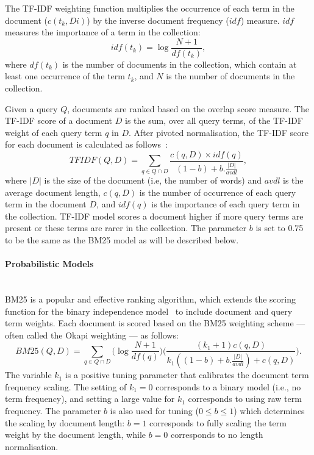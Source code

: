 The TF-IDF weighting function multiplies the occurrence of each term in the document ($ c(t_{k},Di)$)
by the inverse document frequency ($ idf $) measure. $ idf $ measures the importance of a term in the collection: 
\begin{equation}
idf(t_{k})=\log\frac{N+1}{df(t_{k})},
\label{eq:idf}
\end{equation}
where $ df(t_{k}) $ is the number of documents in the collection, which contain at least one occurrence of the term $ t_{k} $, and $ N $ is the number of documents in the collection. 

Given a query $Q$, documents are ranked based on the overlap score measure. The TF-IDF score of a document $D$ is the sum, over all query terms, of the TF-IDF weight of each query term $q$ in $D$. After pivoted normalisation, the TF-IDF score for each document is calculated as follows~\citep{bache2010improving}:
\begin{equation}
TFIDF(Q,D)=\sum\limits_{q \in Q\cap D}\frac{c(q,D)\times idf(q)}{(1-b)+b.\frac{|D|}{avdl}},
\label{eq:tfidf}
\end{equation}
where $ |D| $ is the size of the document (i.e, the number of words) and $ avdl $ is the average document length, $ c(q,D)$ is the number of occurrence of each query term in the document $D$, and $idf(q)$ is the importance of each query term in the collection. TF-IDF model scores a document higher if more query terms are present or these terms are rarer in the collection. The parameter $ b $ is set to 0.75 to be the same as the BM25 model as will be described below.
\paragraph{Probabilistic Models}
\ \\
BM25 is a popular and effective ranking algorithm, which extends the scoring function for the binary independence model~\citep{manning2008introduction} to include document and query term weights. Each document is scored based on the BM25 weighting scheme --- often called the Okapi weighting --- as follows:
\begin{equation}
BM25(Q,D)=\sum\limits_{q \in Q\cap D}\Bigg(\log\frac{N+1}{df(q)}\Bigg)\Bigg(\frac{(k_{1}+1)c(q,D)}{k_{1}((1-b)+b.\frac{|D|}{avdl})+c(q,D)}\Bigg).
\label{eq:idfbm25}
\end{equation}
The variable $ k_{1} $ is a positive tuning parameter that calibrates the document term frequency scaling. The setting of $ k_{1}=0 $ corresponds to a binary model (i.e., no term frequency), and setting a large value for $ k_{1} $ corresponds to using raw term
frequency. The parameter $ b $ is also used for tuning ($ 0 \leq b \leq 1 $) which determines the scaling by document length: $ b = 1 $ corresponds to fully scaling the term weight by the document length, while $ b = 0 $ corresponds to no length normalisation. 

